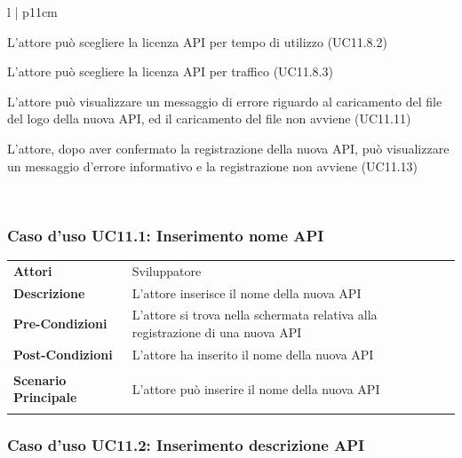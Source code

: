 \begin{longtable}{ l | p{11cm}}
\begin{enumerate*}[label=(\arabic*.),itemjoin={\newline}]
			\item L'attore può scegliere la licenza API per tempo di utilizzo (UC11.8.2)
			\item L'attore può scegliere la licenza API per traffico (UC11.8.3)
			\item L'attore può visualizzare un messaggio di errore riguardo al caricamento del file del logo della nuova API, ed il caricamento del file non avviene (UC11.11)
			\item L'attore, dopo aver confermato la registrazione della nuova API, può visualizzare un messaggio d'errore informativo e la registrazione non avviene (UC11.13)
	\end{enumerate*}\\
\end{longtable}

\subsubsection{Caso d'uso UC11.1: Inserimento nome API}
\label{UC11_1}

\begin{minipage}{\linewidth}
	\begin{tabular}{ l | p{11cm}}
		\hline
		\rowcolor{Gray}
		\multicolumn{2}{c}{UC11.1 - Inserimento nome API} \\
		\hline
		\textbf{Attori} & Sviluppatore \\
		\textbf{Descrizione} & L'attore inserisce il nome della nuova API \\
		\textbf{Pre-Condizioni} & L'attore si trova nella schermata relativa alla registrazione di una nuova API \\
		\textbf{Post-Condizioni} & L'attore ha inserito il nome della nuova API \\
		\textbf{Scenario Principale} & 
		\begin{enumerate*}[label=(\arabic*.),itemjoin={\newline}]
			\item L'attore può inserire il nome della nuova API
		\end{enumerate*}\\
	\end{tabular}
\end{minipage}

\subsubsection{Caso d'uso UC11.2: Inserimento descrizione API}
\label{UC11_2}

